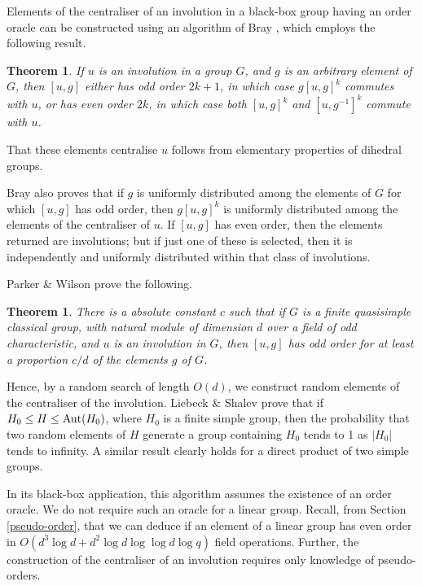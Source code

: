 \documentclass[12pt]{article}
\newtheorem{theorem}[definition]{Theorem}
\def\Oh{O}  %
\begin{document}
Elements of the centraliser of an involution in a black-box 
group having an order
oracle can be constructed using an algorithm of Bray \cite{Bray},
which employs the following result.
\begin{theorem}
\label{thm:bray}
If $u$ is an involution in a group $G$, and $g$ is an arbitrary element of $G$,
then $[u,g]$ either has odd order $2k+1$, in which case
$g[u,g]^k$ commutes with $u$, or has even order $2k$, in which case
both $[u,g]^k$ and $[u,g^{-1}]^k$ commute with $u$.
\end{theorem}
That these elements centralise $u$ follows from elementary
properties of dihedral groups. 

Bray \cite{Bray} also proves that if $g$ is uniformly
distributed among the elements of $G$ for which $[u,g]$
has odd order, then $g[u,g]^k$ is uniformly distributed among the
elements of the centraliser of $u$. If $[u,g]$ has even order, 
then the elements returned are involutions; but if just
one of these is selected, then it is independently and uniformly 
distributed within that class of involutions.

Parker \& Wilson \cite{PW05} prove the following.
\begin{theorem}\label{clasthm}
There is a absolute constant $c$ such that if $G$ is a finite
quasisimple classical group, with natural module
of dimension $d$ over a field of odd characteristic,
and $u$ is an involution in $G$, then $[u,g]$ has odd order
for at least a proportion $c/d$ of the elements $g$ of $G$.
\end{theorem}

Hence, by a random search of length $\Oh(d)$, we construct
random elements of the centraliser of the involution. 
Liebeck \& Shalev \cite{lish} prove that if $H_0 \leq H \leq {\rm Aut}(H_0)$,
where $H_0$ is a finite simple group, then the probability that
two random elements of $H$ generate a group containing 
$H_0$ tends to 1 as $|H_0|$ tends to infinity. A similar
result clearly holds for a direct product of two simple groups.

In its black-box application, this algorithm 
assumes the existence of an order oracle.
We do not require such an oracle for a linear group.
Recall, from Section \ref{pseudo-order},
that we can deduce if an element of a linear 
group has even order in 
$O(d^3 \log d + d^2 \log d \log\log d\log q)$ field operations. 
Further, the construction of the centraliser
of an involution requires only knowledge of pseudo-orders.
\end{document}
